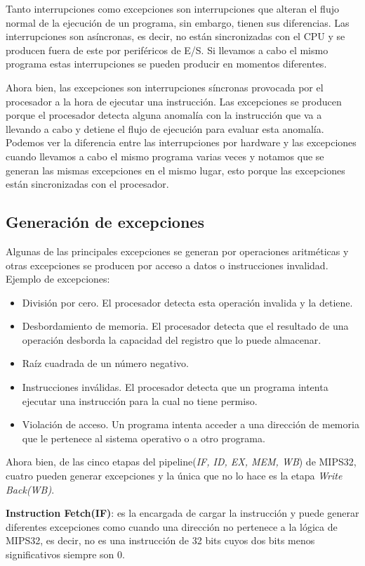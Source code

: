 \documentclass[12pt, a4paper]{article}
\begin{document}
Tanto interrupciones como excepciones son interrupciones que alteran el flujo normal de la ejecución de un programa, sin embargo, tienen sus diferencias. Las interrupciones son asíncronas, es decir, no están sincronizadas con el CPU y se producen fuera de este por periféricos de E/S. Si llevamos a cabo el mismo programa estas interrupciones se pueden producir en momentos diferentes.

Ahora bien, las excepciones son interrupciones síncronas provocada por el procesador a la hora de ejecutar una instrucción. Las excepciones se producen porque el procesador detecta alguna anomalía con la instrucción que va a llevando a cabo y detiene el flujo de ejecución para evaluar esta anomalía. Podemos ver la diferencia entre las interrupciones por hardware y las excepciones cuando llevamos a cabo el mismo programa varias veces y notamos que se generan las mismas excepciones en el mismo lugar, esto porque las excepciones están sincronizadas con el procesador.

\subsection{Generación de excepciones}
Algunas de las principales excepciones se generan por operaciones aritméticas y otras excepciones se producen por acceso a datos o instrucciones invalidad. Ejemplo de excepciones:
\begin{itemize}
    \item División por cero. El procesador detecta esta operación invalida y la detiene.
    \item Desbordamiento de memoria. El procesador detecta que el resultado de una operación desborda la capacidad del registro que lo puede almacenar.
    \item Raíz cuadrada de un número negativo.
    \item Instrucciones inválidas. El procesador detecta que un programa intenta ejecutar una instrucción para la cual no tiene permiso.
    \item Violación de acceso. Un programa intenta acceder a una dirección de memoria que le pertenece al sistema operativo o a otro programa.
\end{itemize}

Ahora bien, de las cinco etapas del pipeline(\textit{IF, ID, EX, MEM, WB}) de MIPS32, cuatro pueden generar excepciones y la única que no lo hace es la etapa \textit{Write Back(WB)}.

\textbf{Instruction Fetch(IF)}: es la encargada de cargar la instrucción y puede generar diferentes excepciones como cuando una dirección no pertenece a la lógica de MIPS32, es decir, no es una instrucción de 32 bits cuyos dos bits menos significativos siempre son 0.
\end{document}
